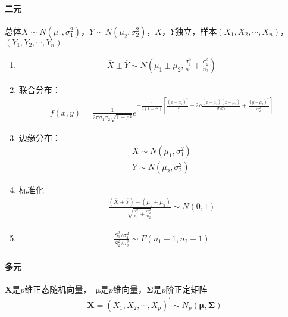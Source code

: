 \documentclass[12pt]{book}
\begin{document}
\paragraph{二元}

总体$X\sim N(\mu_1,\sigma_1^2)$，$Y\sim N(\mu_2,\sigma_2^2)$，$X$，$Y$独立，样本$(X_1,X_2,\cdots,X_n)$，$(Y_1,Y_2,\cdots,Y_n)$


\begin{enumerate}[1.]
    \item \begin{gather*}
        \overline{X}\pm\overline{Y}\sim N\left(\mu_1\pm \mu_2,\frac{\sigma_1^2}{n_1}+\frac{\sigma_2^2}{n_2}\right)
    \end{gather*}
    \item 联合分布：
    \begin{gather*}
        f(x,y) = \frac{1}{2\pi \sigma_1 \sigma_2\sqrt{1-\rho^2}} e^{
            -\frac{1}{2(1-\rho^2)}
            \left[\frac{(x-\mu_1)^2}{\sigma_1^2} - 2\rho \frac{(x-\mu_1)(x-\mu_2)}{\sigma_1 \sigma_2}+\frac{(y-\mu_2)^2}{\sigma_2^2} \right]
        }
    \end{gather*}
    \item 边缘分布：
    \begin{gather*}
        X\sim N(\mu_1,\sigma_1^2)\\
        Y\sim N(\mu_2,\sigma_2^2)
    \end{gather*}
    \item 标准化
    \begin{gather*}
        \frac{(\overline{X}\pm \overline{Y})-(\mu_1 \pm \mu_2)}{\sqrt{
            \frac{\sigma_1^2}{n_1}+\frac{\sigma_2^2}{n_2}
            }}\sim N(0,1)
    \end{gather*}
    \item \begin{gather*}
        \frac{S_1^2/\sigma_1^2}{S_2^2/\sigma_2^2}\sim F(n_1-1,n_2-1)
    \end{gather*}
\end{enumerate}




\paragraph{多元}

$\mathbf{X}$是$p$维正态随机向量，\ $\mathbf{\mu}$是$p$维向量，$\bm{\Sigma}$是$p$阶正定矩阵
\begin{gather*}
    \mathbf{X}
    = \left(X_1,X_2,\cdots,X_p\right)^\prime
    \sim N_p(\bm{\mu},\bm{\Sigma} )
\end{gather*}
\end{document}
